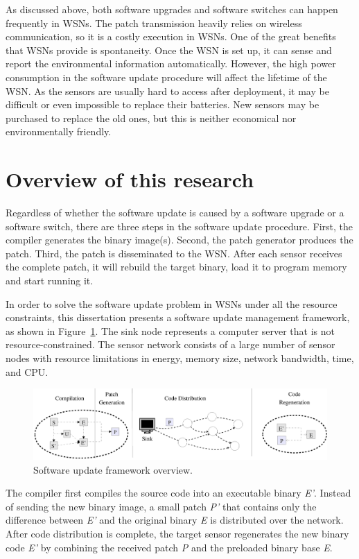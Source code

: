 As discussed above, both software upgrades and software switches can happen frequently in WSNs. The patch transmission heavily relies on wireless communication, so it is a costly execution in WSNs.
One of the great benefits that WSNs provide is spontaneity. Once the WSN is set up, it can sense and report
the environmental information automatically.
However, the high power consumption in the software update procedure will affect the lifetime of the WSN.
As the sensors are usually hard to access after deployment, it may be difficult or even impossible to replace their batteries. New sensors may be purchased to replace the old ones, but this is neither economical nor environmentally friendly.

\section{Overview of this research}

Regardless of whether the software update is caused by a software upgrade or a software switch, there are three steps in the software update procedure.
First, the compiler generates the binary image(s).
Second, the patch generator produces the patch.
Third, the patch is disseminated to the WSN.
After each sensor receives the complete patch, it will rebuild the target binary, load it to program memory and start running it.

In order to solve the software update problem in WSNs under all the resource constraints, this dissertation presents a software update management framework, as shown in Figure~\ref{fig:overview}. 
The sink node represents a computer server that is not resource-constrained. The sensor network consists of a large number of sensor nodes with resource limitations in energy, memory size, network bandwidth, time, and CPU.

\begin{figure}[htbp]
	\centering
		\includegraphics[scale=0.45]{figures/model.eps}
	\caption{Software update framework overview.}
	\label{fig:overview}
\end{figure}


The compiler first compiles the source code into an executable binary {\it E'}. 
Instead of sending the new binary image, a small patch {\it P'} that contains only the difference between {\it E'} and the original binary {\it E} is distributed over the network.  After code distribution is complete, the target sensor regenerates the new binary code {\it E'} by combining the received patch {\it P} and the preloaded binary base {\it E}. 


